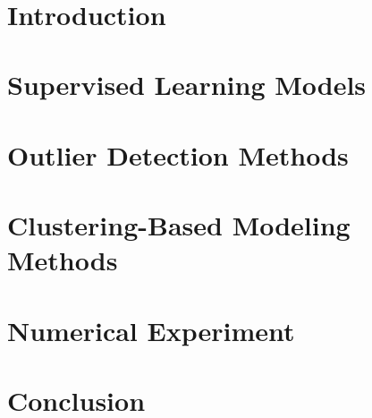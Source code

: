 \documentclass[english]{article}
\author{\authorthing}
\title{\textbf{\titlemark}}
\begin{document}
\maketitle

\abstract{}

\section{Introduction}
\par

\section{Supervised Learning Models}

\section{Outlier Detection Methods}

\section{Clustering-Based Modeling Methods}

\section{Numerical Experiment}

\section{Conclusion}



\end{document}
